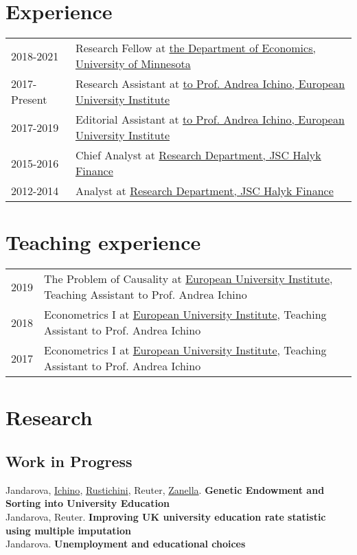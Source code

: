 \documentclass{article}
\begin{document}
    \section*{Experience}
  \begin{table}[H]
      \begin{tabular}{p{2cm}p{14cm}}
          2018-2021 & Research Fellow at \href{https://cla.umn.edu/economics}{the Department of Economics, University of Minnesota} \\
          2017-Present & Research Assistant at \href{https://www.eui.eu}{to Prof. Andrea Ichino, European University Institute} \\
          2017-2019 & Editorial Assistant at \href{https://www.eui.eu}{to Prof. Andrea Ichino, European University Institute} \\
          2015-2016 & Chief Analyst at \href{https://www.halykfinance.kz}{Research Department, JSC Halyk Finance} \\
          2012-2014 & Analyst at \href{https://www.halykfinance.kz}{Research Department, JSC Halyk Finance} \\
      \end{tabular}
    \end{table}


    \section*{Teaching experience}
  \begin{table}[H]
      \begin{tabular}{p{2cm}p{14cm}}
          2019 & {The Problem of Causality} at \href{https://www.eui.eu}{European University Institute}, Teaching Assistant to Prof. Andrea Ichino\\
          2018 & {Econometrics I} at \href{https://www.eui.eu}{European University Institute}, Teaching Assistant to Prof. Andrea Ichino\\
          2017 & {Econometrics I} at \href{https://www.eui.eu}{European University Institute}, Teaching Assistant to Prof. Andrea Ichino\\
      \end{tabular}
    \end{table}


    \section*{Research}\subsection*{Work in Progress}
      Jandarova, \href{http://www.andreaichino.it}{Ichino}, \href{https://sites.google.com/site/aldorustichini/}{Rustichini}, Reuter, \href{https://sites.google.com/site/giuliozanella/}{Zanella}. \textbf{Genetic Endowment and Sorting into University Education}\\
      Jandarova, Reuter. \textbf{Improving UK university education rate statistic using multiple imputation}\\
      Jandarova. \textbf{Unemployment and educational choices}\\
\end{document}
